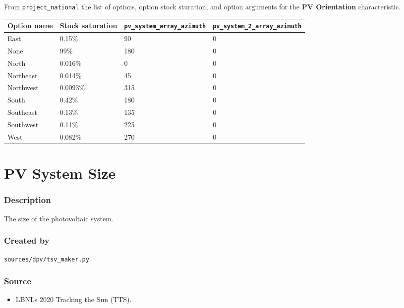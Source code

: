 From \texttt{project\_national} the list of options, option stock
sturation, and option arguments for the \textbf{PV Orientation}
characteristic.

\begin{longtable}[]{@{}llll@{}}
\toprule\noalign{}
Option name & Stock saturation & \texttt{pv\_system\_array\_azimuth} &
\texttt{pv\_system\_2\_array\_azimuth} \\
\midrule\noalign{}
\endhead
\bottomrule\noalign{}
\endlastfoot
East & 0.15\% & 90 & 0 \\
None & 99\% & 180 & 0 \\
North & 0.016\% & 0 & 0 \\
Northeast & 0.014\% & 45 & 0 \\
Northwest & 0.0093\% & 315 & 0 \\
South & 0.42\% & 180 & 0 \\
Southeast & 0.13\% & 135 & 0 \\
Southwest & 0.11\% & 225 & 0 \\
West & 0.082\% & 270 & 0 \\
\end{longtable}

\section{PV System Size}\label{pv_system_size}

\subsubsection{Description}\label{description-128}

The size of the photovoltaic system.

\subsubsection{Created by}\label{created-by-129}

\texttt{sources/dpv/tsv\_maker.py}

\subsubsection{Source}\label{source-131}

\begin{itemize}
 
\item
  LBNL\textquotesingle s 2020 Tracking the Sun (TTS).
\end{itemize}

